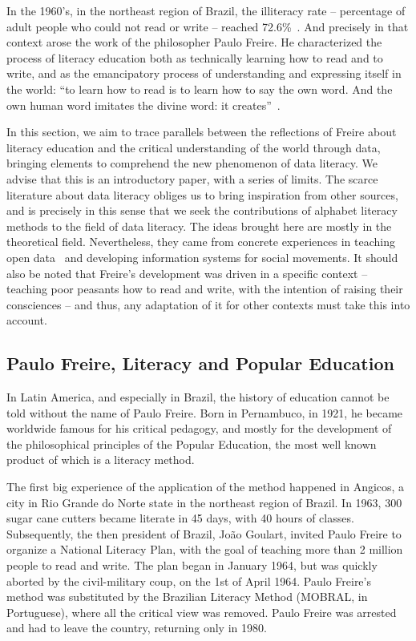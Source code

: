 In the 1960's, in the northeast region of Brazil, the illiteracy rate -- percentage of adult people who could not read or write -- reached 72.6\%~\cite{Ferraro2004}.
And precisely in that context arose the work of the philosopher Paulo Freire. He characterized the process of literacy education both as technically learning how to read and to write, and as the emancipatory process of understanding and expressing itself in the world: ``to learn how to read is to learn how to say the own word. And the own human word imitates the divine word: it creates''~\cite[p.11]{Freire1987}.

In this section, we aim to trace parallels between the reflections of Freire about literacy education and the critical understanding of the world through data, bringing elements to comprehend the new phenomenon of data literacy. We advise that this is an introductory paper, with a series of limits. The scarce literature about data literacy obliges us to bring inspiration from other sources, and is precisely in this sense that we seek the contributions of alphabet literacy methods to the field of data literacy. The ideas brought here are mostly in the theoretical field. Nevertheless, they came from concrete experiences in teaching open data~\cite{Tygel2015} and developing information systems for social movements. It should also be noted that Freire's development was driven in a specific context -- teaching poor peasants how to read and write, with the intention of raising their consciences -- and thus, any adaptation of it for other contexts must take this into account.

\subsection{Paulo Freire, Literacy and Popular Education}

In Latin America, and especially in Brazil, the history of education cannot be told without the name of Paulo Freire. Born in Pernambuco, in 1921, he became worldwide famous for his critical pedagogy, and mostly for the development of the philosophical principles of the Popular Education, the most well known product of which is a literacy method.

The first big experience of the application of the method happened in Angicos, a city in Rio Grande do Norte state in the northeast region of Brazil. In 1963, 300 sugar cane cutters became literate in 45 days, with 40 hours of classes. Subsequently, the then president of Brazil, João Goulart, invited Paulo Freire to organize a National Literacy Plan, with the goal of teaching more than 2 million people to read and write. The plan began in January 1964, but was quickly aborted by the civil-military coup, on the 1st of April 1964. Paulo Freire's method was substituted by the Brazilian Literacy Method (MOBRAL, in Portuguese), where all the critical view was removed. Paulo Freire was arrested and had to leave the country, returning only in 1980. 

